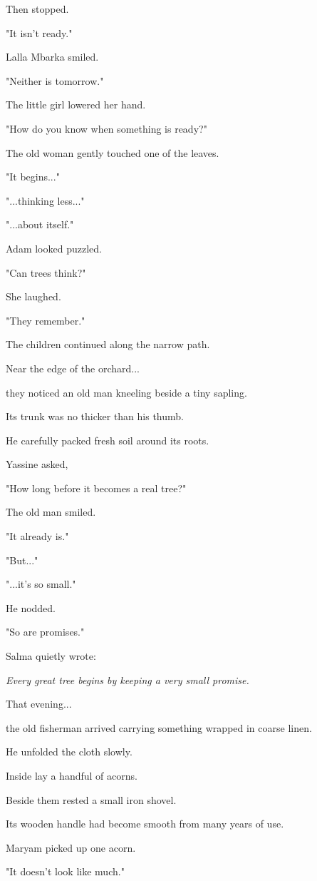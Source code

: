 \documentclass[12pt,openany]{book}
\begin{document}
Then stopped.

"It isn't ready."

Lalla Mbarka smiled.

"Neither is tomorrow."

The little girl lowered her hand.

"How do you know when something is ready?"

The old woman gently touched one of the leaves.

"It begins..."

"...thinking less..."

"...about itself."

Adam looked puzzled.

"Can trees think?"

She laughed.

"They remember."

The children continued along the narrow path.

Near the edge of the orchard...

they noticed an old man kneeling beside a tiny sapling.

Its trunk was no thicker than his thumb.

He carefully packed fresh soil around its roots.

Yassine asked,

"How long before it becomes a real tree?"

The old man smiled.

"It already is."

"But..."

"...it's so small."

He nodded.

"So are promises."

Salma quietly wrote:

\emph{Every great tree begins by keeping a very small promise.}

That evening...

the old fisherman arrived carrying something wrapped in coarse linen.

He unfolded the cloth slowly.

Inside lay a handful of acorns.

Beside them rested a small iron shovel.

Its wooden handle had become smooth from many years of use.

Maryam picked up one acorn.

"It doesn't look like much."
\end{document}
